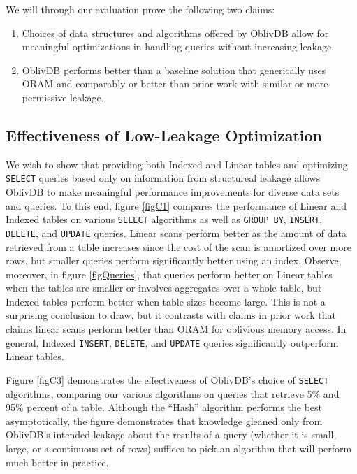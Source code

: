 \documentclass[conference]{IEEEtran}
\def\name/{OblivDB}
\begin{document}
We will through our evaluation prove the following two claims: 

\begin{enumerate}
\item Choices of data structures and algorithms offered by \name/ allow for meaningful optimizations in handling queries without increasing leakage. 

\item \name/ performs better than a baseline solution that generically uses ORAM and comparably or better than prior work with similar or more permissive leakage.
\end{enumerate}

\subsection{Effectiveness of Low-Leakage Optimization}
We wish to show that providing both Indexed and Linear tables and optimizing \texttt{SELECT} queries based only on information from structureal leakage allows \name/ to make meaningful performance improvements for diverse data sets and queries. To this end, figure \ref{figC1} compares the performance of Linear and Indexed tables on various \texttt{SELECT} algorithms as well as \texttt{GROUP BY}, \texttt{INSERT}, \texttt{DELETE}, and \texttt{UPDATE} queries. Linear scans perform better as the amount of data retrieved from a table increases since the cost of the scan is amortized over more rows, but smaller queries perform significantly better using an index. Observe, moreover, in figure \ref{figQueries}, that queries perform better on Linear tables when the tables are smaller or involves aggregates over a whole table, but Indexed tables perform better when table sizes become large. This is not a surprising conclusion to draw, but it contrasts with claims in prior work \cite{RLT15} that claims linear scans perform better than ORAM for oblivious memory access. In general, Indexed \texttt{INSERT}, \texttt{DELETE}, and \texttt{UPDATE} queries significantly outperform Linear tables.

Figure \ref{figC3} demonstrates the effectiveness of \name/'s choice of \texttt{SELECT} algorithms, comparing our various algorithms on queries that retrieve 5\% and 95\% percent of a table. Although the ``Hash'' algorithm performs the best asymptotically, the figure demonstrates that knowledge gleaned only from \name/'s intended leakage about the results of a query (whether it is small, large, or a continuous set of rows) suffices to pick an algorithm that will perform much better in practice. 
\end{document}
